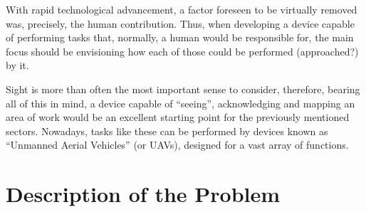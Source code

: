 With rapid technological advancement, a factor foreseen to be virtually removed was, precisely, the human contribution. Thus, when developing a device capable of performing tasks that, normally, a human would be responsible for, the main focus should be envisioning how each of those could be performed (approached?) by it.

Sight is more than often the most important sense to consider, therefore, bearing all of this in mind, a device capable of ``seeing'', acknowledging and mapping an area of work would be an excellent starting point for the previously mentioned sectors. Nowadays, tasks like these can be performed by devices known as ``Unmanned Aerial Vehicles'' (or UAVs), designed for a vast array of functions.


\section{Description of the Problem}\label{sec:I_description}



